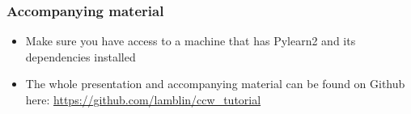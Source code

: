 \documentclass[mathserif, xcolor=dvipsnames]{beamer}
\begin{document}
\begin{frame}
    \frametitle{Accompanying material}
    \begin{itemize}\addtolength{\itemsep}{3.0\baselineskip}
        \item{\Large Make sure you have access to a machine that has Pylearn2
              and its dependencies installed}
        \item{\Large The whole presentation and accompanying material can be
              found on Github here: \url{https://github.com/lamblin/ccw\_tutorial}}
    \end{itemize}
\end{frame}
\end{document}
